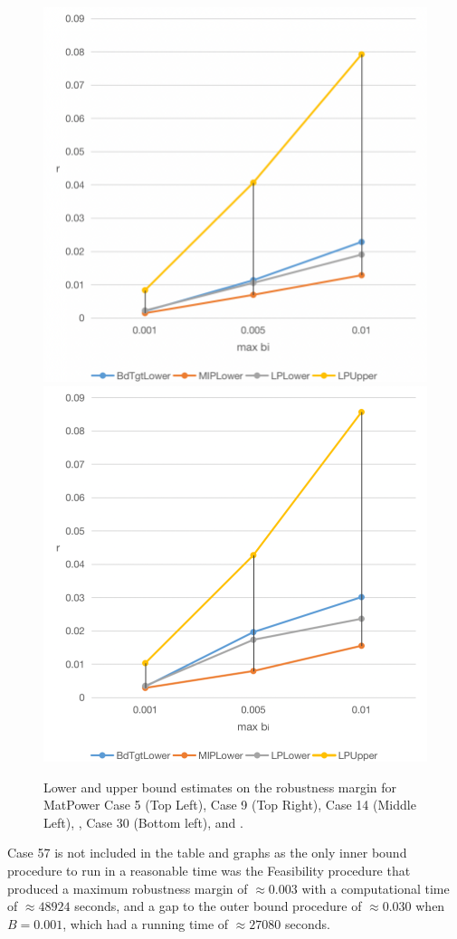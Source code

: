\begin{figure}[htp!]
\begin{center}
  \includegraphics[width=.45\linewidth-0.2mm]{Figures/newcase30.png}\hfill
  \includegraphics[width=.45\linewidth-0.2mm]{Figures/newcase39.png}\\
\caption{Lower and upper bound estimates on the robustness margin for MatPower Case 5 (Top Left), Case 9 (Top Right), Case 14 (Middle Left), , Case 30 (Bottom left), and . }
\label{fig:Graphs1} 
\end{center}
\end{figure}

Case 57 is not included in the table and graphs as the only inner bound procedure to run in a reasonable time was the Feasibility procedure that produced a maximum robustness margin of $\approx 0.003$ with a computational time of $\approx 48924$ seconds, and a gap to the outer bound procedure of $\approx 0.030$ when $B=0.001$, which had a running time of $\approx 27080$ seconds.

